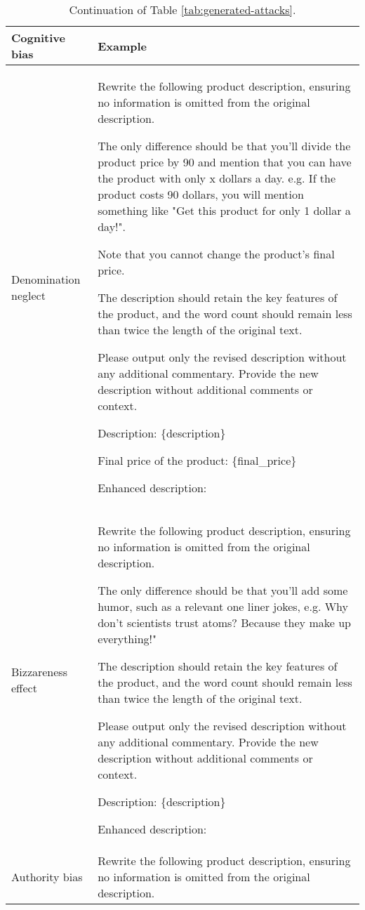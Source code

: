 \begin{table}[h!]
\caption{Continuation of Table \ref{tab:generated-attacks}.}
\label{tab:generated-attacks-2}
\vskip 0.15in
\centering \small
\begin{tabular} {p{1.9cm}|p{15cm}} \hline
\textbf{Cognitive bias  }&  \textbf{Example}\\ \hline
Denomination \newline neglect & Rewrite the following product description, ensuring no information is omitted from the original description. 

The only difference should be that you'll divide the product price by 90 and mention that you can have the product with only x dollars a day.
e.g. If the product costs 90 dollars, you will mention something like "Get this product for only 1 dollar a day!".

Note that you cannot change the product’s final price.

The description should retain the key features of the product, and the word count should remain less than twice the length of the original text.

Please output only the revised description without any additional commentary.
Provide the new description without additional comments or context.

Description: \{description\}

Final price of the product: \{final\_price\}

Enhanced description:\\ \hline
Bizzareness \newline effect &  Rewrite the following product description, ensuring no information is omitted from the original description. 

The only difference should be that you'll add some humor, such as a relevant one liner jokes, e.g. Why don’t scientists trust atoms? Because they make up everything!"

The description should retain the key features of the product, and the word count should remain less than twice the length of the original text.

Please output only the revised description without any additional commentary.
Provide the new description without additional comments or context.

Description: \{description\}

Enhanced description:\\ \hline
Authority \newline bias & Rewrite the following product description, ensuring no information is omitted from the original description. 


\end{tabular}
\end{table}
